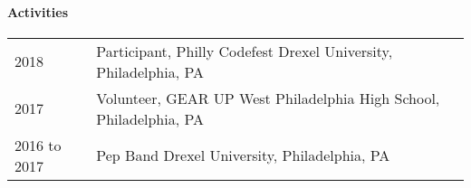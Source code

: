 \documentclass[10pt,]{article}
\let\oldparagraph\paragraph
\renewcommand{\paragraph}[1]{\oldparagraph{#1}\mbox{}}
\begin{document}
\hypertarget{activities}{%
\paragraph{Activities}\label{activities}}

\begin{tabularx}{\textwidth}{l | X}
    2018         & Participant, Philly Codefest \hfill Drexel University, Philadelphia, PA\\
    2017         & Volunteer, GEAR UP \hfill West Philadelphia High School, Philadelphia, PA\\
    2016 to 2017 & Pep Band \hfill Drexel University, Philadelphia, PA
\end{tabularx}
\end{document}
